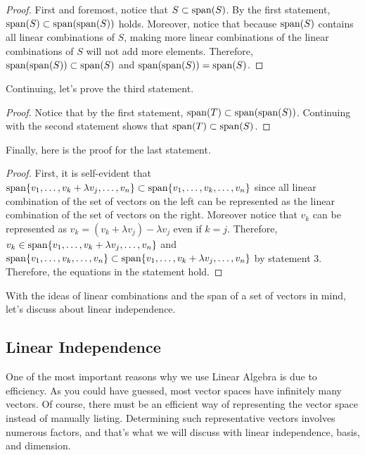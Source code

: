 \documentclass[../main.tex]{subfiles}
\begin{document}
\begin{proof}
First and foremost, notice that $S \subset \operatorname{span}(S)$. By the first
statement, $\operatorname{span}(S) \subset \operatorname{span}(\operatorname{span}(S))$ holds. Moreover,
notice that because $\operatorname{span}(S)$ contains all linear combinations of
$S$, making more linear combinations of the linear combinations of
$S$ will not add more elements. Therefore, $\operatorname{span}(\operatorname{span}(S)) \subset
\operatorname{span}(S)$ and $\operatorname{span}(\operatorname{span}(S)) = \operatorname{span}(S)$.
\end{proof}

Continuing, let's prove the third statement.

\begin{proof}
Notice that by the first statement, $\operatorname{span}(T) \subset
\operatorname{span}(\operatorname{span}(S))$. Continuing with the second statement shows that
$\operatorname{span}(T) \subset \operatorname{span}(S)$.
\end{proof}

Finally, here is the proof for the last statement.

\begin{proof}
First, it is self-evident that $\Span\{ v_1, \ldots, v_k
+ \lambda v_j, \ldots, v_n \} \subset \Span\{ v_1, \linebreak \ldots,
v_k, \ldots, v_n \}$ since all linear combination of the set of
vectors on the left can be represented as the linear combination of
the set of vectors on the right. Moreover notice that $v_k$ can be
represented as $v_k = (v_k + \lambda v_j) - \lambda v_j$ even if
$k = j$. Therefore, $v_k \in \operatorname{span}\{ v_1, \ldots, v_k + \lambda v_j,
\ldots, v_n \}$ and $\Span\{ v_1, \ldots, v_k, \ldots, v_n \} \subset
\Span\{ v_1, \ldots, v_k + \lambda v_j, \linebreak \ldots, v_n \}$ by
statement 3. Therefore, the equations in the statement hold.
\end{proof}

With the ideas of linear combinations and the span of a set of vectors
in mind, let's discuss about linear independence.

\subsection{Linear Independence}

One of the most important reasons why we use Linear Algebra is due to
efficiency. As you could have guessed, most vector spaces have
infinitely many vectors. Of course, there must be an efficient way
of representing the vector space instead of manually listing.
Determining such representative vectors involves numerous factors,
and that's what we will discuss with linear independence, basis,
and dimension.
\end{document}
